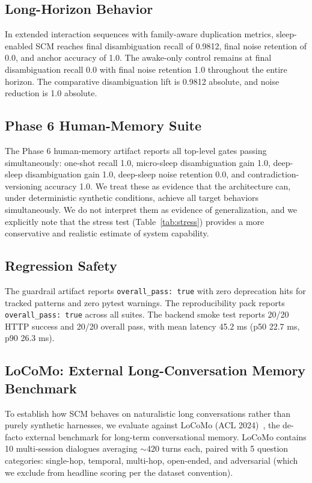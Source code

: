 \documentclass[11pt,twocolumn]{article}
\begin{document}
\subsection{Long-Horizon Behavior}

In extended interaction sequences with family-aware duplication metrics, sleep-enabled SCM reaches final disambiguation recall of 0.9812, final noise retention of 0.0, and anchor accuracy of 1.0. The awake-only control remains at final disambiguation recall 0.0 with final noise retention 1.0 throughout the entire horizon. The comparative disambiguation lift is 0.9812 absolute, and noise reduction is 1.0 absolute.

\subsection{Phase 6 Human-Memory Suite}

The Phase 6 human-memory artifact reports all top-level gates passing simultaneously: one-shot recall 1.0, micro-sleep disambiguation gain 1.0, deep-sleep disambiguation gain 1.0, deep-sleep noise retention 0.0, and contradiction-versioning accuracy 1.0. We treat these as evidence that the architecture can, under deterministic synthetic conditions, achieve all target behaviors simultaneously. We do not interpret them as evidence of generalization, and we explicitly note that the stress test (Table~\ref{tab:stress}) provides a more conservative and realistic estimate of system capability.

\subsection{Regression Safety}

The guardrail artifact reports \texttt{overall\_pass: true} with zero deprecation hits for tracked patterns and zero pytest warnings. The reproducibility pack reports \texttt{overall\_pass: true} across all suites. The backend smoke test reports 20/20 HTTP success and 20/20 overall pass, with mean latency 45.2 ms (p50 22.7 ms, p90 26.3 ms).

\subsection{LoCoMo: External Long-Conversation Memory Benchmark}
\label{sec:locomo}

To establish how SCM behaves on naturalistic long conversations rather than purely synthetic harnesses, we evaluate against LoCoMo (ACL 2024)~\cite{maharana2024locomo}, the de-facto external benchmark for long-term conversational memory. LoCoMo contains 10 multi-session dialogues averaging $\sim$420 turns each, paired with 5 question categories: single-hop, temporal, multi-hop, open-ended, and adversarial (which we exclude from headline scoring per the dataset convention).
\end{document}
